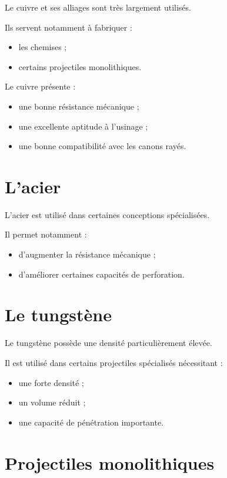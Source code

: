 Le cuivre et ses alliages sont très largement utilisés.

Ils servent notamment à fabriquer :

\begin{itemize}
    \item les chemises ;
    \item certains projectiles monolithiques.
\end{itemize}

Le cuivre présente :

\begin{itemize}
    \item une bonne résistance mécanique ;
    \item une excellente aptitude à l'usinage ;
    \item une bonne compatibilité avec les canons rayés.
\end{itemize}

\section{L'acier}

L'acier est utilisé dans certaines conceptions spécialisées.

Il permet notamment :

\begin{itemize}
    \item d'augmenter la résistance mécanique ;
    \item d'améliorer certaines capacités de perforation.
\end{itemize}

\section{Le tungstène}

Le tungstène possède une densité particulièrement élevée.

Il est utilisé dans certains projectiles spécialisés nécessitant :

\begin{itemize}
    \item une forte densité ;
    \item un volume réduit ;
    \item une capacité de pénétration importante.
\end{itemize}

\section{Projectiles monolithiques}

